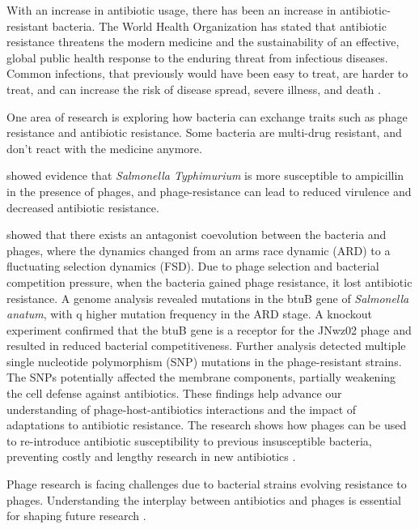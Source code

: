 With an increase in antibiotic usage, there has been an increase in antibiotic-resistant bacteria.
The World Health Organization has stated that antibiotic resistance threatens the modern medicine and the sustainability of an effective, global public health response to the enduring threat from infectious diseases.
Common infections, that previously would have been easy to treat, are harder to treat, and can increase the risk of disease spread, severe illness, and death \cite{GlobalActionPlan}. \newline

One area of research is exploring how bacteria can exchange traits such as phage resistance and antibiotic resistance.
Some bacteria are multi-drug resistant, and don't react with the medicine anymore.

\citet{laurePhageResistancemediatedTradeoffs2022} showed evidence that \textit{Salmonella Typhimurium} is more susceptible to ampicillin in the presence of phages, and phage-resistance can lead to reduced virulence and decreased antibiotic resistance. 

\citet{zhaoPhagedrivenCoevolutionReveals2024} showed that there exists an antagonist coevolution between the bacteria and phages, where the dynamics changed from an arms race dynamic (ARD) to a fluctuating selection dynamics (FSD).
Due to phage selection and bacterial competition pressure, when the bacteria gained phage resistance, it lost antibiotic resistance.
A genome analysis revealed mutations in the btuB gene of \textit{Salmonella anatum}, with q higher mutation frequency in the ARD stage.
A knockout experiment confirmed that the btuB gene is a receptor for the JNwz02 phage and resulted in reduced bacterial competitiveness.
Further analysis detected multiple single nucleotide polymorphism (SNP) mutations in the phage-resistant strains.
The SNPs potentially affected the membrane components, partially weakening the cell defense against antibiotics.
These findings help advance our understanding of phage-host-antibiotics interactions and the impact of adaptations to antibiotic resistance.
The research shows how phages can be used to re-introduce antibiotic susceptibility to previous insusceptible bacteria, preventing costly and lengthy research in new antibiotics \cite{zhaoPhagedrivenCoevolutionReveals2024}. \newline

Phage research is facing challenges due to bacterial strains evolving resistance to phages.
Understanding the interplay between antibiotics and phages is essential for shaping future research \cite{zhaoPhagedrivenCoevolutionReveals2024}.


